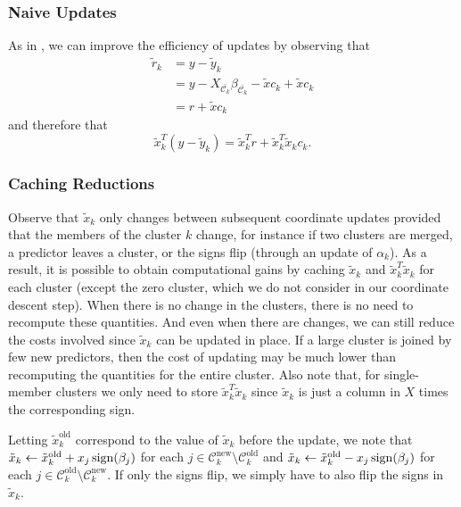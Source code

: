 \subsubsection{Naive Updates}

As in \textcite{friedman2010}, we can improve the efficiency of updates by observing that
\begin{equation*}
  \begin{aligned}
    \tilde r_k & = y - \tilde y_k                                                                       \\
               & = y - X_{\bar{\mathcal{C}_k}}\beta_{\bar{\mathcal{C}_k}} - \tilde x c_k + \tilde x c_k \\
               & = r + \tilde x c_k
  \end{aligned}
\end{equation*}
and therefore that
\begin{equation}
  \label{eq:naive-update}
  \tilde x_k^T (y - \tilde y_k) = \tilde x_k^T r + \tilde x_k^T \tilde x_k c_k.
\end{equation}

\subsubsection{Caching Reductions}

Observe that \(\tilde x_k\) only changes between subsequent coordinate updates provided that the members of the cluster \(k\) change, for instance if two clusters are merged, a predictor leaves a cluster, or the signs flip (through an update of \(\alpha_k\)).
As a result, it is possible to obtain computational gains by caching \(\tilde x_k\) and \(\tilde x_k^T \tilde x_k\) for each cluster (except the zero cluster, which we do not consider in our coordinate descent step).
When there is no change in the clusters, there is no need to recompute these quantities.
And even when there are changes, we can still reduce the costs involved since \(\tilde x_k\) can be updated in place.
If a large cluster is joined by few new predictors, then the cost of updating may be much lower than recomputing the quantities for the entire cluster.
Also note that, for single-member clusters we only need to store \(\tilde x_k^T \tilde x_k\) since \(\tilde x_k\) is just a column in \(X\) times the corresponding sign.

Letting \(\tilde x_k^\text{old}\) correspond to the value of \(\tilde x_k\) before the update, we note that \(\tilde x_k \gets \tilde x_k^\text{old} + x_j \operatorname{sign}(\beta_j)\) for each \(j \in \mathcal{C}_k^\text{new} \setminus \mathcal{C}_k^\text{old}\) and \(\tilde x_k \gets \tilde x_k^\text{old} - x_j \operatorname{sign}(\beta_j)\) for each \(j \in \mathcal{C}_k^\text{old} \setminus \mathcal{C}_k^\text{new}\).
If only the signs flip, we simply have to also flip the signs in \(\tilde x_k\).

